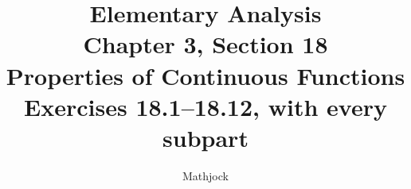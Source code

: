 
\title{\textbf{Elementary Analysis}\\[0.3em]
Chapter 3, Section 18\\[0.3em]
\large Properties of Continuous Functions\\
Exercises 18.1--18.12, with every subpart}
\author{Mathjock}
\date{}

\maketitle
\bookinfo
\tableofcontents
\clearpage
\setcounter{section}{17}


